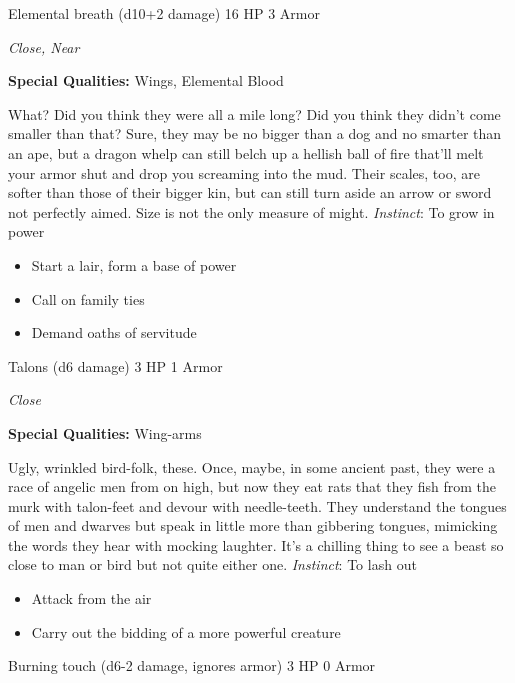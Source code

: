 \HRule
{}

Elemental breath (d10+2 damage)\hspace*{\fill} 16 HP 3 Armor

\emph{Close, Near}

\textbf{Special Qualities:}
Wings, Elemental Blood

\HRule
What? Did you think they were all a mile long? Did you think they didn't come smaller than that? Sure, they may be no bigger than a dog and no smarter than an ape, but a dragon whelp can still belch up a hellish ball of fire that'll melt your armor shut and drop you screaming into the mud. Their scales, too, are softer than those of their bigger kin, but can still turn aside an arrow or sword not perfectly aimed. Size is not the only measure of might. \emph{Instinct}: To grow in power
\begin{itemize}
\item Start a lair, form a base of power
\item Call on family ties
\item Demand oaths of servitude
\end{itemize}
\newpage
\HRule
{}

Talons (d6 damage)\hspace*{\fill} 3 HP 1 Armor

\emph{Close}

\textbf{Special Qualities:}
Wing-arms

\HRule
Ugly, wrinkled bird-folk, these. Once, maybe, in some ancient past, they were a race of angelic men from on high, but now they eat rats that they fish from the murk with talon-feet and devour with needle-teeth. They understand the tongues of men and dwarves but speak in little more than gibbering tongues, mimicking the words they hear with mocking laughter. It's a chilling thing to see a beast so close to man or bird but not quite either one. \emph{Instinct}: To lash out
\begin{itemize}
\item Attack from the air
\item Carry out the bidding of a more powerful creature
\end{itemize}

\HRule
{}

Burning touch (d6-2 damage, ignores armor)\hspace*{\fill} 3 HP 0 Armor

